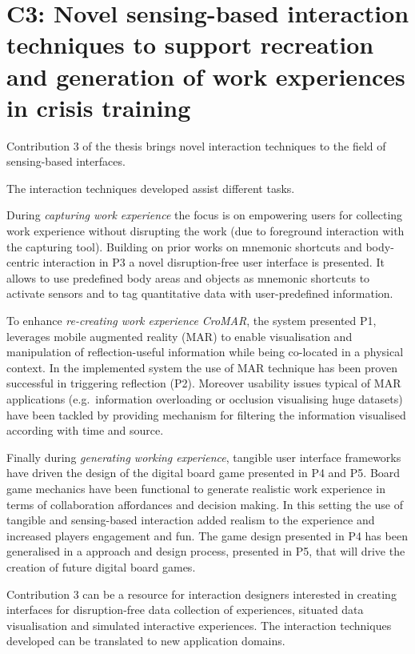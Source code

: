 \section[C3: Novel sensing-based interaction techniques to support recreation and generation of work experiences in crisis training][Contribution 3]{C3: Novel sensing-based interaction techniques to support recreation and generation of work experiences in crisis training}\label{c3}

Contribution 3 of the thesis brings novel interaction techniques to the field of sensing-based interfaces.

The interaction techniques developed assist different tasks.

During \emph{capturing work experience} the focus is on empowering users for collecting work experience without disrupting the work (due to foreground interaction with the capturing tool). Building on prior works on mnemonic shortcuts \autocite{Guerreiro:2008wt} and body-centric interaction \autocite{Chen:2012wk} in P3 a novel disruption-free user interface is presented. It allows to use predefined body areas and objects as mnemonic shortcuts to activate sensors and to tag quantitative data with user-predefined information.

To enhance \emph{re-creating work experience} \emph{CroMAR}, the system presented P1, leverages mobile augmented reality (MAR) to enable visualisation and manipulation of reflection-useful information while being co-located in a physical context. In the implemented system the use of MAR technique has been proven successful in triggering reflection (P2). Moreover usability issues typical of MAR applications (e.g.~information overloading or occlusion visualising huge datasets) have been tackled by providing mechanism for filtering the information visualised according with time and source.

Finally during \emph{generating working experience}, tangible user interface frameworks have driven the design of the digital board game presented in P4 and P5. Board game mechanics have been functional to generate realistic work experience in terms of collaboration affordances and decision making. In this setting the use of tangible and sensing-based interaction added realism to the experience and increased players engagement and fun. The game design presented in P4 has been generalised in a approach and design process, presented in P5, that will drive the creation of future digital board games.

Contribution 3 can be a resource for interaction designers interested in creating interfaces for disruption-free data collection of experiences, situated data visualisation and simulated interactive experiences. The interaction techniques developed can be translated to new application domains.


